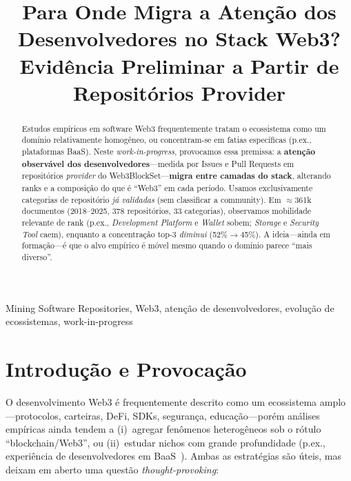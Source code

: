 \documentclass[10pt,conference]{IEEEtran}
\begin{document}
\title{Para Onde Migra a Atenção dos Desenvolvedores no Stack Web3?\\
Evidência Preliminar a Partir de Repositórios Provider}

\author{
}

\maketitle

\begin{abstract}
Estudos empíricos em software Web3 frequentemente tratam o ecossistema como um domínio relativamente homogêneo, ou concentram-se em fatias específicas (p.ex., plataformas BaaS). Neste \emph{work-in-progress}, provocamos essa premissa: a \textbf{atenção observável dos desenvolvedores}---medida por Issues e Pull Requests em repositórios \emph{provider} do Web3BlockSet---\textbf{migra entre camadas do stack}, alterando ranks e a composição do que é ``Web3'' em cada período. Usamos exclusivamente categorias de repositório \emph{já validadas} (sem classificar a community). Em $\approx$361k documentos (2018--2025, 378 repositórios, 33 categorias), observamos mobilidade relevante de rank (p.ex., \emph{Development Platform} e \emph{Wallet} sobem; \emph{Storage} e \emph{Security Tool} caem), enquanto a concentração top-3 \emph{diminui} (52\%$\rightarrow$45\%). A ideia---ainda em formação---é que o alvo empírico é móvel mesmo quando o domínio parece ``mais diverso''.
\end{abstract}

\begin{IEEEkeywords}
Mining Software Repositories, Web3, atenção de desenvolvedores, evolução de ecossistemas, work-in-progress
\end{IEEEkeywords}

\section{Introdução e Provocação}

O desenvolvimento Web3 é frequentemente descrito como um ecossistema amplo---protocolos, carteiras, DeFi, SDKs, segurança, educação---porém análises empíricas ainda tendem a (i)~agregar fenômenos heterogêneos sob o rótulo ``blockchain/Web3'', ou (ii)~estudar nichos com grande profundidade (p.ex., experiência de desenvolvedores em BaaS~\cite{soares2025bcdex}). Ambas as estratégias são úteis, mas deixam em aberto uma questão \emph{thought-provoking}:
\end{document}
